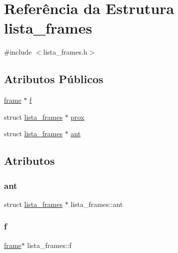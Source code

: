 \hypertarget{structlista__frames}{}\section{Referência da Estrutura lista\+\_\+frames}
\label{structlista__frames}


{\ttfamily \#include $<$lista\+\_\+frames.\+h$>$}

\subsection*{Atributos Públicos}
\begin{DoxyCompactItemize}
\item 
\hyperlink{structframe}{frame} $\ast$ \hyperlink{structlista__frames_ad7777179f480ab04a686cf8edf19addf}{f}
\item 
struct \hyperlink{structlista__frames}{lista\+\_\+frames} $\ast$ \hyperlink{structlista__frames_ac33c75b9e66a517b493e6d35a3c1efb3}{prox}
\item 
struct \hyperlink{structlista__frames}{lista\+\_\+frames} $\ast$ \hyperlink{structlista__frames_a624232f63eb62fe5a297439a4668032c}{ant}
\end{DoxyCompactItemize}


\subsection{Atributos}
\mbox{\label{structlista__frames_a624232f63eb62fe5a297439a4668032c}} 
\subsubsection{\texorpdfstring{ant}{ant}}
{\footnotesize\ttfamily struct \hyperlink{structlista__frames}{lista\+\_\+frames} $\ast$ lista\+\_\+frames\+::ant}

\mbox{\label{structlista__frames_ad7777179f480ab04a686cf8edf19addf}} 
\subsubsection{\texorpdfstring{f}{f}}
{\footnotesize\ttfamily \hyperlink{structframe}{frame}$\ast$ lista\+\_\+frames\+::f}

